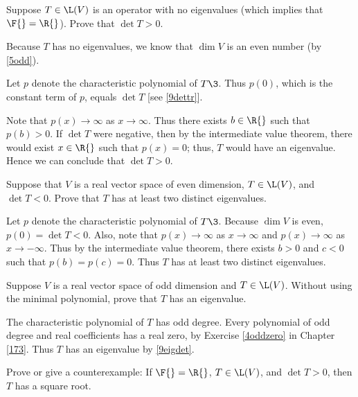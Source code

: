 \exercise
Suppose $T \in \L(V)$ is an operator with no eigenvalues (which implies that $\F{} = \R{}$). Prove that $\det T > 0$.

\begin{Solution}
Because $T$ has no eigenvalues, we know that $\dim V$ is an even number (by \ref{5odd}).

Let $p$ denote the characteristic polynomial of $T\3$. Thus $p(0)$, which is the constant term of $p$, equals $\det T$ [see \ref{9dettr}].

Note that $p(x) \to \infty$ as $x \to \infty$. Thus there exists $b \in \R{}$ such that $p(b) > 0$. If $\det T$ were negative, then by the intermediate value theorem, there would exist $x \in \R{}$ such that $p(x) = 0$; thus, $T$ would have an eigenvalue. Hence we can conclude that $\det T > 0$.
\end{Solution}

\exercise
Suppose that $V$ is a real vector space of even dimension, $T \in \L(V)$, and $\det T < 0$. Prove that $T$ has at least two distinct eigenvalues.

\begin{Solution}
Let $p$ denote the characteristic polynomial of $T\3$. Because $\dim V$ is even, $p(0) = \det T < 0$. Also, note that
$p(x) \to \infty$ as $x \to \infty$ and $p(x) \to \infty$ as $x \to -\infty$. Thus by the intermediate value theorem, there exists $b > 0$ and
$c < 0$ such that $p(b) = p(c) = 0$. Thus $T$ has at least two distinct eigenvalues.
\end{Solution}

\exercise
Suppose $V$ is a real vector space of odd dimension and $T \in \L(V)$. Without using the minimal polynomial, prove that $T$ has an eigenvalue.\label{9oddeigen}

\begin{Solution}
The characteristic polynomial of $T$ has odd degree. Every polynomial of odd degree and real coefficients has a real zero, by Exercise \ref{4oddzero} in Chapter \ref{173}. Thus $T$ has an eigenvalue by \ref{9eigdet}.
\end{Solution}

\exercise
Prove or give a counterexample: If $\F{} = \R{}$, $T \in \L(V)$, and $\det T > 0$, then $T$ has a square root.

